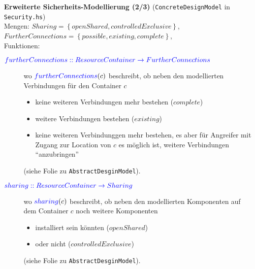 \documentclass[varwidth=18cm]{standalone}
\begin{document}
\textbf{Erweiterte Sicherheits-Modellierung (2/3)} (\texttt{ConcreteDesignModel} in \texttt{Security.hs})\\

Mengen: $Sharing = \left\{openShared, controlledExclusive\right\}$, \\
        $FurtherConnections = \left\{possible, existing, complete \right\}$, \\


Funktionen:
\begin{description}
  \item[${\color{blue}{furtherConnections :: ResourceContainer \rightarrow FurtherConnections}}$]
        wo ${\color{blue}{furtherConnections}}(c)$ beschreibt, ob neben den modellierten
        Verbindungen für den Container $c$ 
        \begin{itemize}
           \item keine weiteren Verbindungen mehr bestehen ($complete$)
           \item weitere Verbindungen bestehen ($existing$)
           \item keine weiteren Verbindunggen mehr bestehen, 
                 es aber für Angreifer mit Zugang zur Location von $c$ es möglich ist,
                 weitere Verbindungen \enquote{anzubringen}
        \end{itemize} (siehe Folie zu \texttt{AbstractDesginModel}).
  \item[${\color{blue}{sharing :: ResourceContainer \rightarrow Sharing}}$]
        wo ${\color{blue}{sharing}}(c)$ beschreibt, ob neben den modellierten
        Komponenten auf dem Container $c$ noch weitere Komponenten
        \begin{itemize}
           \item installiert sein könnten  ($openShared$)
           \item oder nicht ($controlledExclusive$)
        \end{itemize} (siehe Folie zu \texttt{AbstractDesginModel}).
\end{description}
\end{document}
